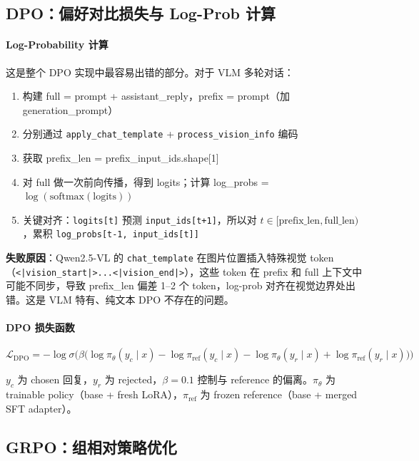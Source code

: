 \documentclass[12pt,a4paper]{ctexart}
\begin{document}
\subsection{DPO：偏好对比损失与 Log-Prob 计算}

\paragraph{Log-Probability 计算} 这是整个 DPO 实现中最容易出错的部分。对于 VLM 多轮对话：

\begin{enumerate}[nosep]
  \item 构建 full = prompt + assistant\_reply，prefix = prompt（加 generation\_prompt）
  \item 分别通过 \texttt{apply\_chat\_template} + \texttt{process\_vision\_info} 编码
  \item 获取 prefix\_len = prefix\_input\_ids.shape[1]
  \item 对 full 做一次前向传播，得到 logits；计算 log\_probs = $\log(\text{softmax}(\text{logits}))$
  \item 关键对齐：\texttt{logits[t]} 预测 \texttt{input\_ids[t+1]}，所以对 $t \in [\text{prefix\_len}, \text{full\_len})$，累积 \texttt{log\_probs[t-1, input\_ids[t]]}
\end{enumerate}

\textbf{失败原因}：Qwen2.5-VL 的 \texttt{chat\_template} 在图片位置插入特殊视觉 token（\texttt{<|vision\_start|>...<|vision\_end|>}），这些 token 在 prefix 和 full 上下文中可能不同步，导致 prefix\_len 偏差 1--2 个 token，log-prob 对齐在视觉边界处出错。这是 VLM 特有、纯文本 DPO 不存在的问题。

\paragraph{DPO 损失函数}
$$\mathcal{L}_{\text{DPO}} = -\log\sigma\Big(\beta\big(\log\pi_\theta(y_c \mid x) - \log\pi_{\text{ref}}(y_c \mid x) - \log\pi_\theta(y_r \mid x) + \log\pi_{\text{ref}}(y_r \mid x)\big)\Big)$$

$y_c$ 为 chosen 回复，$y_r$ 为 rejected，$\beta=0.1$ 控制与 reference 的偏离。$\pi_\theta$ 为 trainable policy（base + fresh LoRA），$\pi_{\text{ref}}$ 为 frozen reference（base + merged SFT adapter）。

\subsection{GRPO：组相对策略优化}
\end{document}
